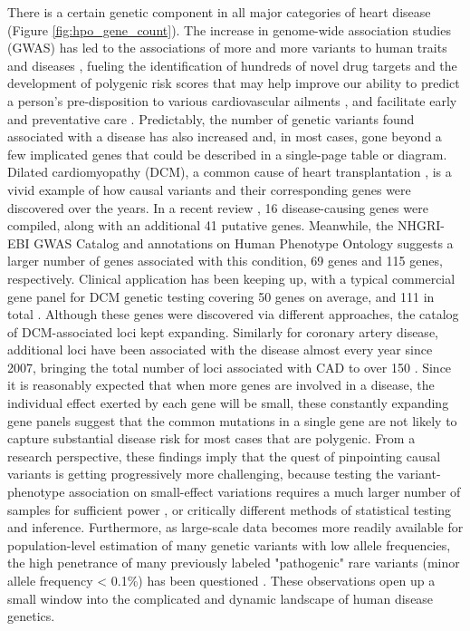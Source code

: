 \documentclass[letter]{bioinfo}
\begin{document}
There is a certain genetic component in all major categories of heart disease (Figure \ref{fig:hpo_gene_count}). The increase in genome-wide association studies (GWAS) has led to the associations of more and more variants to human traits and diseases \citep{Visscher:2017:10}, fueling the identification of hundreds of novel drug targets and the development of polygenic risk scores that may help improve our ability to predict a person's pre-disposition to various cardiovascular ailments \citep{Ganna:2013:Multilocus,Goldstein:2014:Simple,Krarup:2015:genetic,Tada:2016:Risk, Abraham:2016:Genomic}, and facilitate early and preventative care \citep{Assimes:2016:Genetic}. Predictably, the number of genetic variants found associated with a disease has also increased and, in most cases, gone beyond a few implicated genes that could be described in a single-page table or diagram.  Dilated cardiomyopathy (DCM), a common cause of heart transplantation \citep{Burke:2016:Clinical}, is a vivid example of how causal variants and their corresponding genes were discovered over the years.  In a recent review \citep{Burke:2016:Clinical}, 16 disease-causing genes were compiled, along with an additional 41 putative genes.  Meanwhile, the NHGRI-EBI GWAS Catalog \citep{MacArthur:2017:new} and annotations on Human Phenotype Ontology \citep{Kohler:2017:Human} suggests a larger number of genes associated with this condition, 69 genes and 115 genes, respectively. Clinical application has been keeping up, with a typical commercial gene panel for DCM genetic testing covering 50 genes on average, and 111 in total \citep{McNally:2017:Dilated}. Although these genes were discovered via different approaches, the catalog of DCM-associated loci kept expanding. Similarly for coronary artery disease, additional loci have been associated with the disease almost every year since 2007, bringing the total number of loci associated with CAD to over 150 \citep{Clarke:2018:GenomeWide}.  Since it is reasonably expected that when more genes are involved in a disease, the individual effect exerted by each gene will be small, these constantly expanding gene panels suggest that the common mutations in a single gene are not likely to capture substantial disease risk for most cases that are polygenic. From a research perspective, these findings imply that the quest of pinpointing causal variants is getting progressively more challenging, because testing the variant-phenotype association on small-effect variations requires a much larger number of samples for sufficient power \citep{Visscher:2017:10}, or critically different methods of statistical testing and inference. Furthermore, as large-scale data becomes more readily available for population-level estimation of many genetic variants with low allele frequencies, the high penetrance of many previously labeled "pathogenic" rare variants (minor allele frequency < 0.1\%) has been questioned \citep{Lek:2016:Analysis}. These observations open up a small window into the complicated and dynamic landscape of human disease genetics.  
\end{document}
